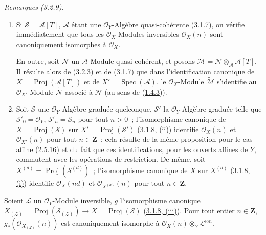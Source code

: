 \par\medskip\noindent\textit{Remarques (3.2.9). ---\ }
\label{II.3.2.9-fr}
\begin{enumerate}
  \item[\rm(i)] Si $\mathcal{S}=\mathcal{A}[T]$, $\mathcal{A}$ étant une
    $\mathcal{O}_Y$-Algèbre quasi-cohérente
    (\hyperref[II.3.1.7-fr]{3.1.7}), on vérifie immédiatement que tous les
    $\mathcal{O}_X$-Modules inversibles $\mathcal{O}_X(n)$ sont canoniquement
    isomorphes à $\mathcal{O}_X$.

    En outre, soit $\mathcal{N}$ un $\mathcal{A}$-Module quasi-cohérent, et
    posons $\mathcal{M}=\mathcal{N}\otimes_{\mathcal{A}}\mathcal{A}[T]$. Il
    résulte alors de (\hyperref[II.3.2.3-fr]{3.2.3}) et de
    (\hyperref[II.3.1.7-fr]{3.1.7}) que dans l'identification canonique de
    $X=\operatorname{Proj}(\mathcal{A}[T])$ et de
    $X'=\operatorname{Spec}(\mathcal{A})$, le $\mathcal{O}_X$-Module
    $\widetilde{\mathcal{M}}$ s'identifie au $\mathcal{O}_{X'}$-Module
    $\widetilde{\mathcal{N}}$ associé à $\mathcal{N}$ (au sens de
    (\hyperref[II.1.4.3-fr]{1.4.3})).
  \item[\rm(ii)] Soit $\mathcal{S}$ une $\mathcal{O}_Y$-Algèbre graduée
    quelconque, $\mathcal{S}'$ la $\mathcal{O}_Y$-Algèbre graduée telle que
    $\mathcal{S}'_0=\mathcal{O}_Y$, $\mathcal{S}'_n=\mathcal{S}_n$ pour tout
    $n>0$~; l'isomorphisme canonique de
    $X=\operatorname{Proj}(\mathcal{S})$ sur
    $X'=\operatorname{Proj}(\mathcal{S}')$
    (\hyperref[II.3.1.8-fr]{3.1.8, (ii)}) identifie $\mathcal{O}_X(n)$ et
    $\mathcal{O}_{X'}(n)$ pour tout $n\in\mathbf{Z}$~: cela résulte de la même
    proposition pour le cas affine (\hyperref[II.2.5.16-fr]{2.5.16}) et du
    fait que ces identifications, pour les ouverts affines de $Y$, commutent
    avec les opérations de restriction. De même, soit
    $X^{(d)}=\operatorname{Proj}(\mathcal{S}^{(d)})$~; l'isomorphisme
    canonique de $X$ sur $X^{(d)}$
    (\hyperref[II.3.1.8-fr]{3.1.8, (i)}) identifie $\mathcal{O}_X(nd)$ et
    $\mathcal{O}_{X^{(d)}}(n)$ pour tout $n\in\mathbf{Z}$.
\end{enumerate}

\begin{proposition}[3.2.10]
\label{II.3.2.10-fr}
Soient $\mathcal{L}$ un $\mathcal{O}_Y$-Module inversible, $g$ l'isomorphisme
canonique
$X_{(\mathcal{L})}=\operatorname{Proj}(\mathcal{S}_{(\mathcal{L})})
\to X=\operatorname{Proj}(\mathcal{S})$
\textup{(\hyperref[II.3.1.8-fr]{3.1.8, (iii)})}. Pour tout entier $n\in\mathbf{Z}$,
$g_*(\mathcal{O}_{X_{(\mathcal{L})}}(n))$ est canoniquement isomorphe à
$\mathcal{O}_X(n)\otimes_Y\mathcal{L}^{\otimes n}$.
\end{proposition}

